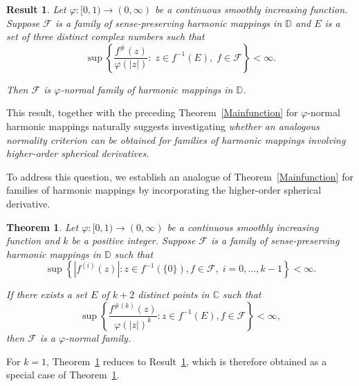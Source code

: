 \documentclass[11pt, reqno]{amsart}
\numberwithin{equation}{section}
\theoremstyle{definition}
\theoremstyle{remark}
\theoremstyle{plain}
\newtheorem{theorem}{Theorem}[section]
\newtheorem{result}{Result}[section]
\begin{document}
\begin{result}\label{threevalue}\cite[Theorem 1.12]{charakbharti}
Let $\varphi:[0,1)\to(0,\infty)$ be a continuous smoothly increasing
function. Suppose $\mathcal{F}$ is a family of sense-preserving harmonic
mappings in $\mathbb{D}$ and $E$ is a set of three distinct
complex numbers such that
\[
\sup\left\{
\frac{f^{\#}(z)}{\varphi(|z|)}
:\;
z\in f^{-1}(E),\;
f\in\mathcal{F}
\right\}
<\infty.
\]

Then $\mathcal{F}$ is $\varphi$-normal family of harmonic mappings in $\mathbb{D}$.
\end{result}

This result, together with the preceding Theorem~\ref{Mainfunction} for
$\varphi$-normal harmonic mappings 
 naturally suggests investigating {\it whether an analogous
normality criterion can be obtained for families of harmonic mappings 
involving higher-order spherical derivatives.}
\smallskip

To address this question, we establish an analogue of 
Theorem~\ref{Mainfunction} for families of harmonic mappings
by incorporating the higher-order spherical derivative.

\begin{theorem}\label{mainfamily}
Let $\varphi:[0,1)\to(0,\infty)$ be a continuous smoothly increasing
function and $k$ be a positive integer. Suppose $\mathcal{F}$
 is a family of sense-preserving harmonic
mappings in $\mathbb{D}$ such that
\begin{equation}\label{eq:1mainfamily}
\sup\left\{
|f^{(i)}(z)|:
z\in f^{-1}(\{0\}), f\in \mathcal{F},\;
i=0,\ldots,k-1
\right\}<\infty.
\end{equation}

If there exists a set $E$ of $k+2$ distinct 
points in $\mathbb{C}$ such that
\begin{equation}\label{eq:2mainfamily}
\sup\left\{
\frac{f^{\#(k)}(z)}{\varphi(|z|)^k}
:
z\in f^{-1}(E), f\in \mathcal{F}
\right\}
<\infty,
\end{equation}
then $\mathcal{F}$ is a $\varphi$-normal family.
\end{theorem}
 \medskip
For $k=1$, Theorem~\ref{mainfamily} reduces to 
Result~\ref{threevalue}, which is therefore obtained  
as a special case of Theorem~\ref{mainfamily}.
\smallskip
\end{document}
